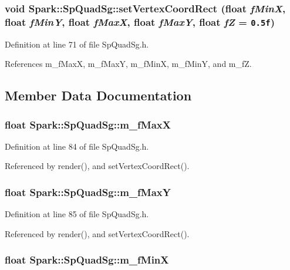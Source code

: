 \subsubsection{\setlength{\rightskip}{0pt plus 5cm}void Spark::Sp\-Quad\-Sg::set\-Vertex\-Coord\-Rect (float {\em f\-Min\-X}, float {\em f\-Min\-Y}, float {\em f\-Max\-X}, float {\em f\-Max\-Y}, float {\em f\-Z} = {\tt 0.5f})\hspace{0.3cm}{\tt  [inline]}}\label{classSpark_1_1SpQuadSg_a3}


Definition at line 71 of file Sp\-Quad\-Sg.h.

References m\_\-f\-Max\-X, m\_\-f\-Max\-Y, m\_\-f\-Min\-X, m\_\-f\-Min\-Y, and m\_\-f\-Z.

\subsection{Member Data Documentation}
\subsubsection{\setlength{\rightskip}{0pt plus 5cm}float {\bf Spark::Sp\-Quad\-Sg::m\_\-f\-Max\-X}\hspace{0.3cm}{\tt  [protected]}}\label{classSpark_1_1SpQuadSg_p2}


Definition at line 84 of file Sp\-Quad\-Sg.h.

Referenced by render(), and set\-Vertex\-Coord\-Rect().
\subsubsection{\setlength{\rightskip}{0pt plus 5cm}float {\bf Spark::Sp\-Quad\-Sg::m\_\-f\-Max\-Y}\hspace{0.3cm}{\tt  [protected]}}\label{classSpark_1_1SpQuadSg_p3}


Definition at line 85 of file Sp\-Quad\-Sg.h.

Referenced by render(), and set\-Vertex\-Coord\-Rect().
\subsubsection{\setlength{\rightskip}{0pt plus 5cm}float {\bf Spark::Sp\-Quad\-Sg::m\_\-f\-Min\-X}\hspace{0.3cm}{\tt  [protected]}}\label{classSpark_1_1SpQuadSg_p0}


